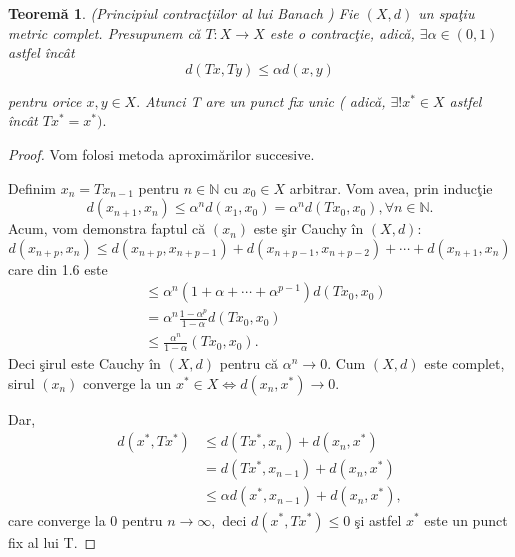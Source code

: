 \documentclass[a4paper,12pt,oneside]{report}
\newtheorem{theorem}{Teorem\u a}
\begin{document}
\begin{theorem}
(Principiul contrac\c{t}iilor al lui Banach ) Fie \(\left ( X,d \right )\) un spa\c{t}iu metric complet. Presupunem c\u{a}  \(T : X \rightarrow X\) este o contrac\c{t}ie, adic\u{a}, \(\exists \alpha  \in \left ( 0,1 \right ) \) astfel \^{i}nc\^{a}t
\[d\left ( Tx, Ty  \right ) \leq \alpha d\left ( x,y \right )\]

pentru orice \(x,y \in X.\) Atunci T are un punct fix unic ( adic\u{a}, \(\exists ! x^{\ast } \in X\) astfel \^{i}nc\^{a}t \(T x^{\ast }  = x^{\ast }).\)
\end{theorem}
\begin{proof}
Vom folosi metoda aproxim\u{a}rilor succesive.

Definim \(x_{n} = Tx_{n - 1}\) pentru \(n \in \mathbb{N}\) cu \(x_{0} \in X\) arbitrar. Vom avea, prin induc\c{t}ie
\begin{displaymath}
  d\left ( x_{n + 1}, x_{n} \right ) \leq  \alpha ^{n}d\left ( x_{1}, x_{0} \right ) = \alpha ^{n}d\left ( Tx_{0}, x_{0} \right ), \forall n \in \mathbb{N}. \label{eq:1.6} \tag{1.6}
\end{displaymath}
Acum, vom demonstra faptul c\u{a} \(\left (x_{n}  \right )\) este \c{s}ir Cauchy \^{i}n \(\left (X, d \right ):\)
\begin{displaymath}
  d\left ( x_{n + p} , x_{n}\right ) \leq d\left ( x_{n + p} , x_{n + p - 1}\right ) + d\left ( x_{n + p - 1} , x_{n + p -2}\right ) + \cdots +d\left ( x_{n + 1} , x_{n}\right )
\end{displaymath}
care din 1.6 este
\begin{equation}\nonumber
    \begin{split}
          & \leq \alpha ^{n}\left ( 1 + \alpha  + \cdots +\alpha ^{p-1} \right )d\left ( Tx_{0}, x_{0} \right ) \\ &  =\alpha  ^{n}\frac{1 -\alpha ^{p}}{1-\alpha }d\left ( Tx_{0}, x_{0} \right ) \\ &   \leq  \frac{\alpha ^{n}}{1-\alpha }\left ( Tx_{0}, x_{0} \right ).
    \end{split}
\end{equation}
Deci \c{s}irul este  Cauchy \^{i}n \(\left ( X,d \right )\) pentru c\u{a} \(\alpha ^{n}\rightarrow 0.\) Cum \(\left ( X,d \right )\) este complet, sirul  \(\left (x_{n}  \right )\) converge la un \(x^{\ast } \in X \Leftrightarrow d\left ( x_{n} ,x^{\ast }\right ) \rightarrow 0.\)

Dar,
\begin{equation} \nonumber
    \begin{split}
        d\left ( x^{\ast }, Tx^{\ast } \right ) &   \leq  d\left ( Tx^{\ast } , x_{n}\right ) + d\left ( x_{n},x^{\ast } \right ) \\ &  =  d\left ( Tx^{\ast } , x_{n-1}\right ) + d\left ( x_{n}, x^{\ast } \right ) \\ &  \leq \alpha d\left ( x^{\ast }, x_{n-1} \right ) + d\left ( x_{n} , x^{\ast }\right ),
    \end{split}
\end{equation}
care converge la 0 pentru \(n \rightarrow \infty,\) deci \(d\left ( x^{\ast } ,Tx^{\ast }\right ) \leq 0\) \c{s}i astfel \(x^{\ast }\) este un punct fix al lui T.


\end{proof}
\end{document}
